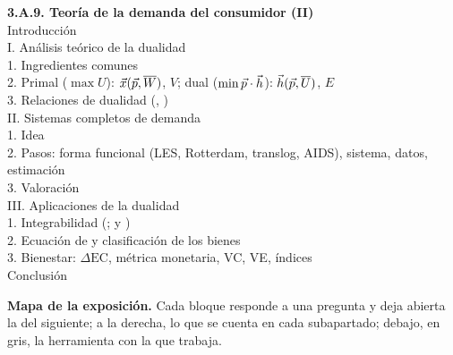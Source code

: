 \documentclass[11pt]{article}
\begin{document}
\begin{esquema}
\textbf{3.A.9. Teoría de la demanda del consumidor (II)}\\[2pt]
Introducción\\
I. Análisis teórico de la dualidad\\
\hspace*{1.5em}1. Ingredientes comunes\\
\hspace*{1.5em}2. Primal ($\max U$): $\vec{x}(\vec{p},\overline{W})$, $V$; dual ($\min \vec{p}\cdot\vec{h}$): $\vec{h}(\vec{p},\overline{U})$, $E$\\
\hspace*{1.5em}3. Relaciones de dualidad (, )\\
II. Sistemas completos de demanda\\
\hspace*{1.5em}1. Idea\\
\hspace*{1.5em}2. Pasos: forma funcional (LES, Rotterdam, translog, AIDS), sistema, datos, estimación\\
\hspace*{1.5em}3. Valoración\\
III. Aplicaciones de la dualidad\\
\hspace*{1.5em}1. Integrabilidad (;  y )\\
\hspace*{1.5em}2. Ecuación de  y clasificación de los bienes\\
\hspace*{1.5em}3. Bienestar: $\Delta\mathrm{EC}$, métrica monetaria, VC, VE, índices\\
Conclusión
\end{esquema}

\begin{anotaciones}
\textbf{Mapa de la exposición.} Cada bloque responde a una pregunta y deja abierta la del siguiente; a la derecha, lo que se cuenta en cada subapartado; debajo, en gris, la herramienta con la que trabaja.
\begin{infografiacaja}
\caption{Mapa del tema: la pregunta de cada bloque, sus subapartados y el hilo que los une}\label{figu:mapa-tema}
\end{infografiacaja}
\end{anotaciones}
\end{document}
